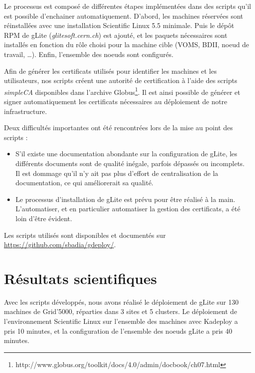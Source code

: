 \documentclass[a4paper,11pt]{article}
\begin{document}
Le processus est composé de différentes étapes implémentées dans des
scripts qu'il est possible d'enchainer automatiquement.  D'abord, les machines
réservées sont réinstallées avec une installation Scientific Linux 5.5
minimale. Puis le dépôt RPM de gLite (\textsl{glitesoft.cern.ch}) est ajouté,
et les paquets nécessaires sont installés en fonction du rôle choisi pour la
machine cible (VOMS, BDII, noeud de travail, \ldots). Enfin, l'ensemble des
noeuds sont configurés.

Afin de générer les certificats utilisés pour identifier les machines et les
utilisateurs, nos scripts créent une autorité de certification à l'aide des
scripts \textsl{simpleCA} disponibles dans l'archive
Globus\footnote{http://www.globus.org/toolkit/docs/4.0/admin/docbook/ch07.html}.
Il est ainsi possible de générer et signer automatiquement les certificats
nécessaires au déploiement de notre infrastructure.

Deux difficultés importantes ont été rencontrées lors de la mise au point des scripts :

\begin{itemize}

\item S'il existe une documentation abondante sur la configuration de gLite,
	les différents documents sont de qualité inégale, parfois dépassés ou
	incomplets. Il est dommage qu'il n'y ait pas  plus d'effort de
	centralisation de la documentation, ce qui améliorerait sa qualité.

\item Le processus d'installation de gLite est prévu pour être réalisé à la
	main. L'automatiser, et en particulier automatiser la gestion des
	certificats, a été loin d'être évident.

\end{itemize}

Les scripts utilisés sont disponibles et documentés sur \url{https://github.com/sbadia/gdeploy/}.

\section{Résultats scientifiques}

Avec les scripts développés, nous avons réalisé le déploiement de gLite sur 130
machines de Grid'5000, réparties dans 3 sites et 5 clusters. Le déploiement
de l'environnement Scientific Linux sur l'ensemble des machines avec Kadeploy a
pris 10 minutes, et la configuration de l'ensemble des noeuds gLite a pris 40
minutes.
\end{document}
